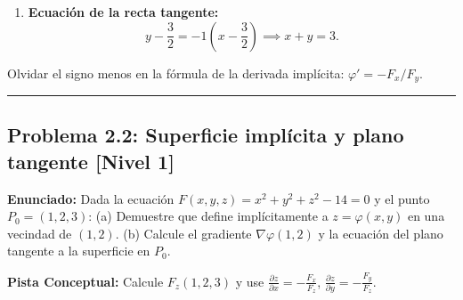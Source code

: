 \documentclass[11pt,a4paper]{article}
\begin{document}
\begin{enumerate}[label=\textbf{\arabic*.}]
\item \textbf{Ecuación de la recta tangente:}
\begin{equation*}
y - \frac{3}{2} = -1\left(x - \frac{3}{2}\right) \implies x + y = 3.
\end{equation*}
\end{enumerate}

\begin{trapbox}
Olvidar el signo menos en la fórmula de la derivada implícita: $\varphi' = -F_x / F_y$.
\end{trapbox}

\vspace{0.5cm}
\hrule
\vspace{0.5cm}

\subsection*{Problema 2.2: Superficie implícita y plano tangente \hfill \color{primaryblue}\small[Nivel 1]}

\begin{tcolorbox}[colback=white,colframe=gray!40,arc=1mm,boxrule=0.5pt,left=3mm,right=3mm,top=2mm,bottom=2mm]
\textbf{Enunciado:} Dada la ecuación $F(x,y,z) = x^2 + y^2 + z^2 - 14 = 0$ y el punto $P_0 = (1, 2, 3)$: (a) Demuestre que define implícitamente a $z = \varphi(x,y)$ en una vecindad de $(1,2)$. (b) Calcule el gradiente $\nabla\varphi(1,2)$ y la ecuación del plano tangente a la superficie en $P_0$.
\end{tcolorbox}

\begin{tcolorbox}[colback=yellow!4,colframe=accentamber!70,arc=1mm,boxrule=0.5pt,left=3mm,right=3mm,top=1.5mm,bottom=1.5mm]
\textbf{Pista Conceptual:} Calcule $F_z(1,2,3)$ y use $\frac{\partial z}{\partial x} = -\frac{F_x}{F_z}$, $\frac{\partial z}{\partial y} = -\frac{F_y}{F_z}$.
\end{tcolorbox}
\end{document}
